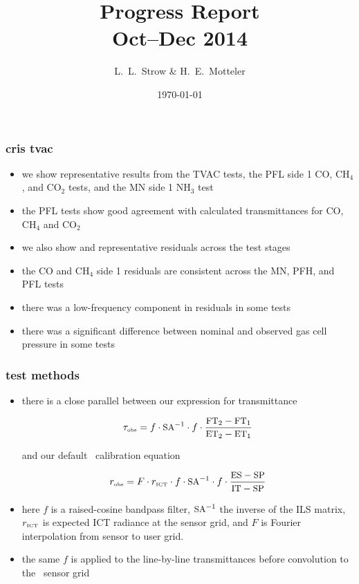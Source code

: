 \documentclass[11pt]{beamer}
\title{Progress Report \\
  Oct--Dec 2014}
\author{L.~L.~Strow \& H.~E.~Motteler}
\institute{
  UMBC Atmospheric Spectroscopy Lab \\
  Joint Center for Earth Systems Technology \\
}
\date{\today}
\begin{document}
\begin{frame}[plain]
\titlepage
\end{frame}
\begin{frame}
\frametitle{cris tvac}

\begin{itemize}

  \item we show representative results from the {\cris} TVAC tests,
    the PFL side 1 CO, CH$_4$, and CO$_2$ tests, and the MN side 1
    NH$_3$ test

  \item the PFL tests show good agreement with calculated
    transmittances for CO, CH$_4$ and CO$_2$

  \item we also show and representative residuals across the test
    stages

  \item the CO and CH$_4$ side 1 residuals are consistent across the
    MN, PFH, and PFL tests

  \item there was a low-frequency component in residuals in some
    tests

  \item there was a significant difference between nominal and
    observed gas cell pressure in some tests

\end{itemize}

\end{frame}
\begin{frame}
\frametitle{test methods}

\begin{itemize}
  \item there is a close parallel between our expression for
    transmittance

    \[\tau_{\mbox{\tiny obs}} = f\cdot\mbox{\small SA}^{-1}\cdot f \cdot \frac{\mbox{\small FT}_2 - \mbox{\small FT}_1}{\mbox{\small ET}_2 - \mbox{\small ET}_1}\]

    and our default \cris\ calibration equation

    \[r_{\mbox{\tiny obs}} = F \cdot r_{\mbox{\tiny ICT}}\cdot f \cdot
    \mbox{\small SA}^{-1}\cdot f \cdot \frac{\mbox{\small ES} - \mbox{\small SP}}{\mbox{\small IT} - \mbox{\small SP}} \]

  \item here $f$ is a raised-cosine bandpass filter, $\mbox{\small SA}^{-1}$ the
    inverse of the ILS matrix, $r_{\mbox{\tiny ICT}}$ is expected ICT
    radiance at the sensor grid, and $F$ is Fourier interpolation
    from sensor to user grid.

  \item the same $f$ is applied to the line-by-line transmittances
    before convolution to the \cris\ sensor grid
 
\end{itemize}

\end{frame}
\end{document}
